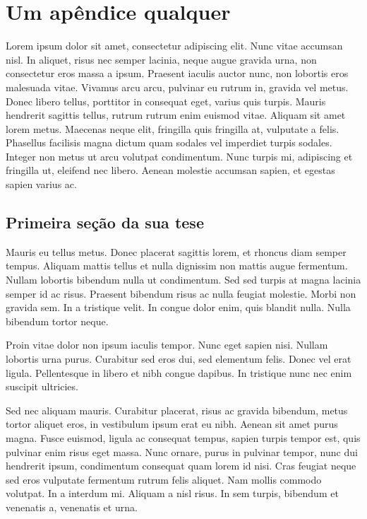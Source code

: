 \chapter{Um ap\^endice qualquer}

Lorem ipsum dolor sit amet, consectetur adipiscing elit. Nunc vitae accumsan nisl. In aliquet, risus nec semper lacinia, neque augue gravida urna, non consectetur eros massa a ipsum. Praesent iaculis auctor nunc, non lobortis eros malesuada vitae. Vivamus arcu arcu, pulvinar eu rutrum in, gravida vel metus. Donec libero tellus, porttitor in consequat eget, varius quis turpis. Mauris hendrerit sagittis tellus, rutrum rutrum enim euismod vitae. Aliquam sit amet lorem metus. Maecenas neque elit, fringilla quis fringilla at, vulputate a felis. Phasellus facilisis magna dictum quam sodales vel imperdiet turpis sodales. Integer non metus ut arcu volutpat condimentum. Nunc turpis mi, adipiscing et fringilla ut, eleifend nec libero. Aenean molestie accumsan sapien, et egestas sapien varius ac.

\section{Primeira se\c{c}\~ao da sua tese}

Mauris eu tellus metus. Donec placerat sagittis lorem, et rhoncus diam semper tempus. Aliquam mattis tellus et nulla dignissim non mattis augue fermentum. Nullam lobortis bibendum nulla ut condimentum. Sed sed turpis at magna lacinia semper id ac risus. Praesent bibendum risus ac nulla feugiat molestie. Morbi non gravida sem. In a tristique velit. In congue dolor enim, quis blandit nulla. Nulla bibendum tortor neque.

Proin vitae dolor non ipsum iaculis tempor. Nunc eget sapien nisi. Nullam lobortis urna purus. Curabitur sed eros dui, sed elementum felis. Donec vel erat ligula. Pellentesque in libero et nibh congue dapibus. In tristique nunc nec enim suscipit ultricies.

Sed nec aliquam mauris. Curabitur placerat, risus ac gravida bibendum, metus tortor aliquet eros, in vestibulum ipsum erat eu nibh. Aenean sit amet purus magna. Fusce euismod, ligula ac consequat tempus, sapien turpis tempor est, quis pulvinar enim risus eget massa. Nunc ornare, purus in pulvinar tempor, nunc dui hendrerit ipsum, condimentum consequat quam lorem id nisi. Cras feugiat neque sed eros vulputate fermentum rutrum felis aliquet. Nam mollis commodo volutpat. In a interdum mi. Aliquam a nisl risus. In sem turpis, bibendum et venenatis a, venenatis et urna.

